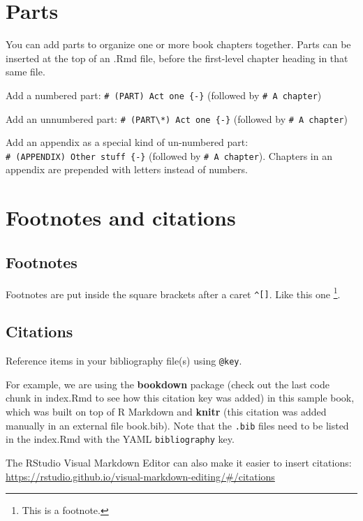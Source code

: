 \documentclass[
]{book}
\theoremstyle{definition}
\theoremstyle{definition}
\theoremstyle{definition}
\theoremstyle{definition}
\theoremstyle{remark}
\begin{document}
\hypertarget{parts}{%
\chapter{Parts}\label{parts}}

You can add parts to organize one or more book chapters together. Parts can be inserted at the top of an .Rmd file, before the first-level chapter heading in that same file.

Add a numbered part: \texttt{\#\ (PART)\ Act\ one\ \{-\}} (followed by \texttt{\#\ A\ chapter})

Add an unnumbered part: \texttt{\#\ (PART\textbackslash{}*)\ Act\ one\ \{-\}} (followed by \texttt{\#\ A\ chapter})

Add an appendix as a special kind of un-numbered part: \texttt{\#\ (APPENDIX)\ Other\ stuff\ \{-\}} (followed by \texttt{\#\ A\ chapter}). Chapters in an appendix are prepended with letters instead of numbers.

\hypertarget{footnotes-and-citations}{%
\chapter{Footnotes and citations}\label{footnotes-and-citations}}

\hypertarget{footnotes}{%
\section{Footnotes}\label{footnotes}}

Footnotes are put inside the square brackets after a caret \texttt{\^{}{[}{]}}. Like this one \footnote{This is a footnote.}.

\hypertarget{citations}{%
\section{Citations}\label{citations}}

Reference items in your bibliography file(s) using \texttt{@key}.

For example, we are using the \textbf{bookdown} package \citep{R-bookdown} (check out the last code chunk in index.Rmd to see how this citation key was added) in this sample book, which was built on top of R Markdown and \textbf{knitr} \citep{xie2015} (this citation was added manually in an external file book.bib).
Note that the \texttt{.bib} files need to be listed in the index.Rmd with the YAML \texttt{bibliography} key.

The RStudio Visual Markdown Editor can also make it easier to insert citations: \url{https://rstudio.github.io/visual-markdown-editing/\#/citations}
\end{document}
